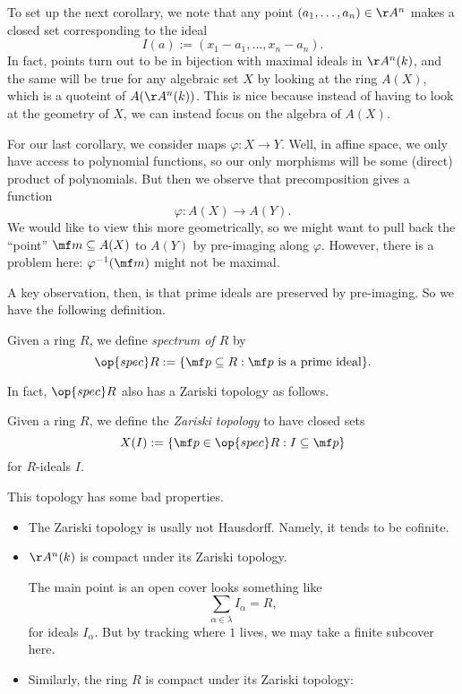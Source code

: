 To set up the next corollary, we note that any point $(a_1,\ldots,a_n)\in\AA^n$ makes a closed set corresponding to the ideal
\[I(a):=(x_1-a_1,\ldots,x_n-a_n).\]
In fact, points turn out to be in bijection with maximal ideals in $\AA^n(k)$, and the same will be true for any algebraic set $X$ by looking at the ring $A(X)$, which is a quoteint of $A(\AA^n(k))$. This is nice because instead of having to look at the geometry of $X$, we can instead focus on the algebra of $A(X)$.

For our last corollary, we consider maps $\varphi:X\to Y$. Well, in affine space, we only have access to polynomial functions, so our only morphisms will be some (direct) product of polynomials. But then we observe that precomposition gives a function
\[\varphi:A(X)\rightarrow A(Y).\]
We would like to view this more geometrically, so we might want to pull back the ``point'' $\mf m\subseteq A(X)$ to $A(Y)$ by pre-imaging along $\varphi$. However, there is a problem here: $\varphi^{-1}(\mf m)$ might not be maximal.

A key observation, then, is that prime ideals are preserved by pre-imaging. So we have the following definition.
\begin{definition}
	Given a ring $R$, we define \textit{spectrum of $R$} by
	\[\op{spec}R:=\{\mf p\subseteq R:\mf p\text{ is a prime ideal}\}.\]
\end{definition}
In fact, $\op{spec}R$ also has a Zariski topology as follows.
\begin{definition}
	Given a ring $R$, we define the \textit{Zariski topology} to have closed sets
	\[X(I):=\{\mf p\in\op{spec}R:I\subseteq\mf p\}\]
	for $R$-ideals $I$.
\end{definition}
This topology has some bad properties.
\begin{itemize}
	\item The Zariski topology is usally not Hausdorff. Namely, it tends to be cofinite.
	\item $\AA^n(k)$ is compact under its Zariski topology.

	The main point is an open cover looks something like
	\[\sum_{\alpha\in\lambda}I_\alpha=R,\]
	for ideals $I_\alpha$. But by tracking where $1$ lives, we may take a finite subcover here.
	\item Similarly, the ring $R$ is compact under its Zariski topology:
\end{itemize}

